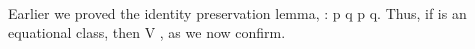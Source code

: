 \begin{code}
\>[2]\AgdaSpace{}%
\AgdaSymbol{=}\AgdaSpace{}%
\AgdaSpace{}%
\AgdaSymbol{(}\AgdaSpace{}%
\AgdaOperator{\AgdaInductiveConstructor{,}}\AgdaSpace{}%
\AgdaSpace{}%
\AgdaSymbol{)}\AgdaSpace{}%
\AgdaSymbol{(}\AgdaSpace{}%
\AgdaOperator{\AgdaInductiveConstructor{,}}\AgdaSpace{}%
\AgdaSpace{}%
\AgdaSymbol{)}\AgdaSpace{}%
\AgdaSpace{}%
\AgdaBound{\AgdaUnderscore{}}\AgdaSpace{}%
\AgdaBound{\AgdaUnderscore{}}\AgdaSpace{}%
\AgdaSpace{}%
\AgdaSymbol{)}\AgdaSpace{}%
\AgdaSpace{}%
\AgdaBound{\AgdaUnderscore{}}\AgdaSpace{}%
\AgdaSpace{}%
\AgdaSymbol{)}\<%
\\
\>[0]\<%
\end{code}
Earlier we proved the identity preservation lemma,
 :   \ab p  \ab q       \ab p  \ab q.
Thus, if  is an equational class, then \af V   , as we now confirm.

